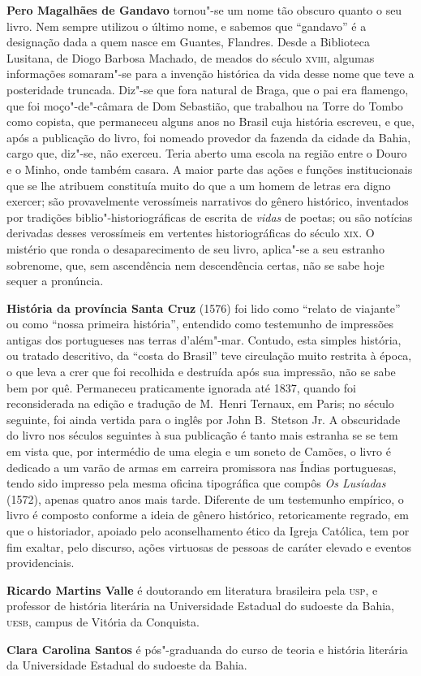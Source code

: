 
\textbf{Pero Magalhães de Gandavo} tornou"-se um nome tão
obscuro quanto o seu livro. Nem sempre utilizou o último nome, e sabemos que
``gandavo'' é a designação dada a quem nasce em Guantes, Flandres.  Desde a
Biblioteca Lusitana, de Diogo Barbosa Machado, de meados do século
\textsc{xviii}, algumas informações somaram"-se para a invenção histórica da
vida desse nome que teve a posteridade truncada. Diz"-se que fora natural de
Braga, que o pai era flamengo, que foi moço"-de"-câmara de Dom Sebastião, que
trabalhou na Torre do Tombo como copista, que permaneceu alguns anos no Brasil
cuja história escreveu, e que, após a publicação do livro, foi nomeado provedor
da fazenda da cidade da Bahia, cargo que, diz"-se, não exerceu. Teria aberto
uma escola na região entre o Douro e o Minho, onde também casara. A maior parte
das ações e funções institucionais que se lhe atribuem constituía muito do que a
um homem de letras era digno exercer; são provavelmente verossímeis narrativos
do gênero histórico, inventados por tradições biblio"-historiográficas de
escrita de \textit{vidas} de poetas; ou são notícias derivadas desses
verossímeis em vertentes historiográficas do século \textsc{xix}. O mistério que
ronda o desaparecimento de seu livro, aplica"-se a seu estranho sobrenome, que,
sem ascendência nem descendência certas, não se sabe hoje sequer a pronúncia.
       
\textbf{História da província Santa Cruz} (1576) foi lido como ``relato de
viajante'' ou como ``nossa primeira história'', entendido como testemunho de
impressões antigas dos portugueses nas terras d'além"-mar. Contudo, esta
simples história, ou tratado descritivo, da ``costa do Brasil'' teve circulação
muito restrita à época, o que leva a crer que foi recolhida e destruída após sua
impressão, não se sabe bem por quê. Permaneceu praticamente ignorada até 1837,
quando foi reconsiderada na edição e tradução de M.~Henri Ternaux, em Paris; no
século seguinte, foi ainda vertida para o inglês por John B.~Stetson Jr. A
obscuridade do livro nos séculos seguintes à sua publicação é tanto mais
estranha se se tem em vista que, por intermédio de uma elegia e um soneto de
Camões, o livro é dedicado a um varão de armas em carreira promissora nas Índias
portuguesas, tendo sido impresso pela mesma oficina tipográfica que compôs
\textit{Os Lusíadas} (1572), apenas quatro anos mais tarde. Diferente de um
testemunho empírico, o livro é composto conforme a ideia de gênero histórico,
retoricamente regrado, em que o historiador, apoiado pelo aconselhamento ético
da Igreja Católica, tem por fim exaltar, pelo discurso, ações virtuosas de
pessoas de caráter elevado e eventos providenciais. 

\textbf{Ricardo Martins Valle} é doutorando em literatura brasileira pela
\textsc{usp}, e professor de história literária na Universidade Estadual do
sudoeste da Bahia, \textsc{uesb}, campus de Vitória da Conquista.

\textbf{Clara Carolina Santos} é pós"-graduanda do curso de teoria e história
literária da Universidade Estadual do sudoeste da Bahia.  


